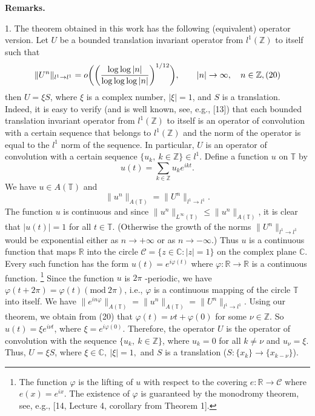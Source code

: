 \documentclass[12pt]{article}
\begin{document}
\quad

\textbf{Remarks.}

   1. The theorem obtained in this work has the following
(equivalent) operator version. Let $U$ be a bounded translation
invariant operator from $l^1(\mathbb Z)$ to itself such that
$$
\|U^n\|_{l^1\rightarrow l^1}=
o\bigg(\bigg(\frac{\log\log |n|}{\log\log\log |n|}\bigg)^{1/12}\bigg),
\qquad |n|\rightarrow\infty, \quad n\in \mathbb Z,
\relax(20)
$$
then $U=\xi S$, where $\xi$ is a complex number, $|\xi|=1$, and
$S$ is a translation. Indeed, it is easy to verify (and is well
known, see, e.g., [13]) that each bounded translation invariant
operator from $l^1(\mathbb Z)$ to itself is an operator of
convolution with a certain sequence that belongs to $l^1(\mathbb
Z)$ and the norm of the operator is equal to the $l^1$ norm of the
sequence. In particular, $U$ is an operator of convolution with a
certain sequence $\{u_k, ~k\in \mathbb Z\}\in l^1$. Define a
function $u$ on $\mathbb T$ by
$$
u(t)=\sum_{k\in\mathbb Z} u_k e^{ikt}.
$$
We have $u\in A(\mathbb T)$ and
$$
\|u^n\|_{A(\mathbb T)}=\|U^n\|_{l^1\rightarrow l^1}.
$$
The function $u$ is continuous and since
$\|u^n\|_{L^\infty(\mathbb T)}\leq\|u^n\|_{A(\mathbb T)}$, it is
clear that $|u(t)|=1$ for all $t\in\mathbb T$. (Otherwise the
growth of the norms $\|U^n\|_{l^1\rightarrow l^1}$ would be
exponential either as $n\rightarrow +\infty$ or as $n\rightarrow
-\infty$.) Thus $u$ is a continuous function that maps $\mathbb R$
into the circle $\mathcal{C}=\{z\in \mathbb C : |z|=1\}$ on the
complex plane $\mathbb C$. Every such function has the form
$u(t)=e^{i\varphi(t)}$ where $\varphi : \mathbb
R\rightarrow\mathbb R$ is a continuous function. \footnote{The
function $\varphi$ is the lifting of $u$ with respect to the
covering $e: \mathbb R\rightarrow \mathcal{C}$ where
$e(x)=e^{ix}$. The existence of $\varphi$ is guaranteed by the
monodromy theorem, see, e.g., [14, Lecture 4, corollary from
Theorem 1].} Since the function $u$ is $2\pi$ -periodic, we have
$\varphi(t+2\pi)=\varphi(t)(\mathrm{mod} ~2\pi)$, i.e., $\varphi$
is a continuous mapping of the circle $\mathbb T$ into itself. We
have $\|e^{in\varphi}\|_{A(\mathbb T)}=\|u^n\|_{A(\mathbb
T)}=\|U^n\|_{l^1\rightarrow l^1}$. Using our theorem, we obtain
from (20) that $\varphi(t)=\nu t+\varphi(0)$ for some
$\nu\in\mathbb Z$. So $u(t)=\xi e^{i\nu t}$, where
$\xi=e^{i\varphi(0)}$. Therefore, the operator $U$ is the operator
of convolution with the sequence $\{u_k, ~k\in\mathbb Z\}$, where
$u_k=0$ for all $k\neq \nu$ and $u_\nu=\xi$. Thus, $U=\xi S$,
where $\xi\in\mathbb C, ~|\xi|=1,$ and $S$ is a translation ($S :
\{x_k\}\rightarrow \{x_{k-\nu}\}$).
\end{document}
